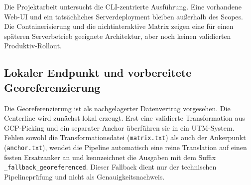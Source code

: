 Die Projektarbeit untersucht die CLI-zentrierte Ausführung. Eine vorhandene
Web-UI und ein tatsächliches Serverdeployment bleiben außerhalb des Scopes.
Die Containerisierung und die nichtinteraktive Matrix zeigen eine für einen
späteren Serverbetrieb geeignete Architektur, aber noch keinen validierten
Produktiv-Rollout.

\subsection{Lokaler Endpunkt und vorbereitete Georeferenzierung}

Die Georeferenzierung ist als nachgelagerter Datenvertrag vorgesehen. Die
Centerline wird zunächst lokal erzeugt. Erst eine validierte Transformation aus
GCP-Picking und ein separater Anchor überführen sie in ein UTM-System. Fehlen
sowohl die Transformationsdatei (\texttt{matrix.txt}) als auch der
Ankerpunkt (\texttt{anchor.txt}), wendet die Pipeline automatisch eine reine
Translation auf einen festen Ersatzanker an und kennzeichnet die Ausgaben mit
dem Suffix \texttt{\_fallback\_georeferenced}. Dieser Fallback dient nur der
technischen Pipelineprüfung und nicht als Genauigkeitsnachweis.
